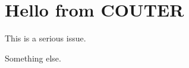 \documentclass[main]{subfiles}
\begin{document}
\ifSubfilesClassLoaded{
    \tikzexternalize[prefix=couter/figcache/]
} {
}

\section {Hello from COUTER}

This is a serious issue.

Something else.
\end{document}
